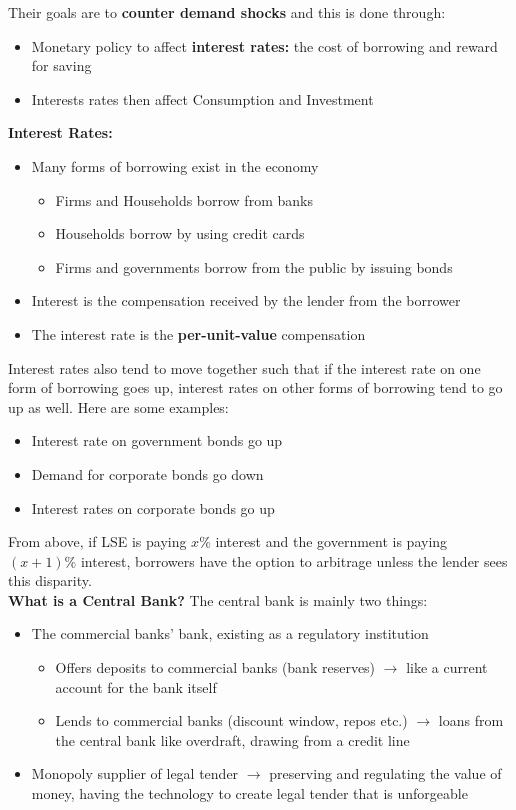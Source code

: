 \documentclass[12pt, letterpaper]{article}
\begin{document}
Their goals are to \textbf{counter demand shocks} and this is done through:
\begin{itemize}
	\item Monetary policy to affect \textbf{interest rates:} the cost of borrowing and reward for saving
	\item Interests rates then affect Consumption and Investment\\
\end{itemize}
\textbf{Interest Rates:}
\begin{itemize}
	\item Many forms of borrowing exist in the economy
		\begin{itemize}
			\item Firms and Households borrow from banks
			\item Households borrow by using credit cards
			\item Firms and governments borrow from the public by issuing bonds
		\end{itemize}
	\item Interest is the compensation received by the lender from the borrower
	\item The interest rate is the \textbf{per-unit-value} compensation
\end{itemize}
Interest rates also tend to move together such that if the interest rate on one form of borrowing goes up, interest rates on other forms of borrowing tend to go up as well. Here are some examples:
\begin{itemize}
	\item Interest rate on government bonds go up
	\item Demand for corporate bonds go down
	\item Interest rates on corporate bonds go up
\end{itemize}
From above, if LSE is paying $x\%$ interest and the government is paying $(x+1)\%$ interest, borrowers have the option to arbitrage unless the lender sees this disparity.\\
\textbf{What is a Central Bank?}
The central bank is mainly two things:
\begin{itemize}
	\item The commercial banks' bank, existing as a regulatory institution
		\begin{itemize}
			\item Offers deposits to commercial banks (bank reserves) $\rightarrow$ like a current account for the bank itself
			\item Lends to commercial banks (discount window, repos etc.) $\rightarrow$ loans from the central bank like overdraft, drawing from a credit line
		\end{itemize}
	\item Monopoly supplier of legal tender $\rightarrow$ preserving and regulating the value of money, having the technology to create legal tender that is unforgeable\\
\end{itemize}
\end{document}
